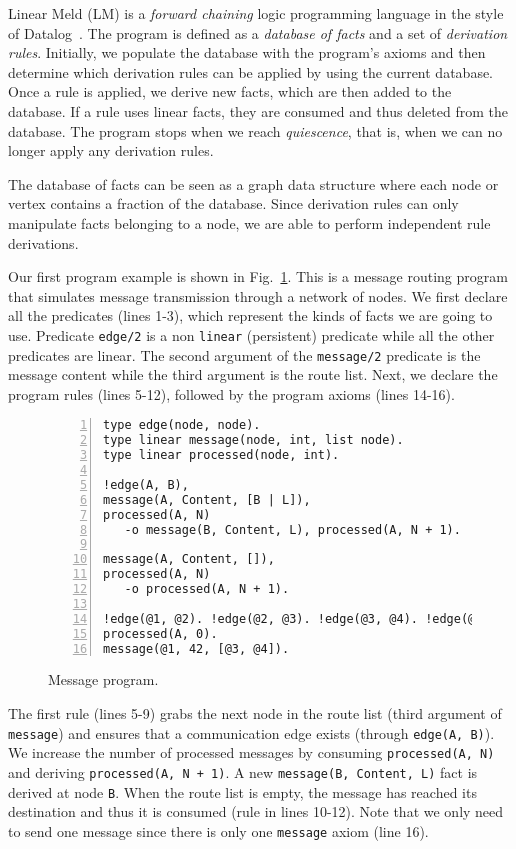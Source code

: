 
Linear Meld (LM) is a \emph{forward chaining} logic programming language in the style of Datalog~\cite{Ullman:1990:PDK:533142}. The program is defined as a \emph{database of facts} and a set of \emph{derivation rules}.
Initially, we populate the database with the program's axioms and then determine which derivation rules can be applied by using the current database. Once a rule is applied, we derive new facts, which are then added to the database.
If a rule uses linear facts, they are consumed and thus deleted from the database.
The program stops when we reach \emph{quiescence}, that is, when we can no longer
apply any derivation rules.

The database of facts can be seen as a graph data structure where each node or vertex contains a
fraction of the database.  Since derivation rules can only manipulate facts belonging to
a node, we are able to perform independent rule derivations.

Our first program example is shown in Fig.~\ref{code:message}. This is a message routing program
that simulates message transmission through a network of nodes.
We first declare all the predicates (lines 1-3), which represent the kinds of facts we are going to
use. Predicate \texttt{edge/2} is a non \texttt{linear} (persistent) predicate while all the other predicates are linear.
The second argument of the \texttt{message/2} predicate is the message content
while the third argument is the route list. Next, we declare the program rules (lines 5-12),
followed by the program axioms (lines 14-16).

\begin{figure}[h!]
\small\begin{Verbatim}[numbers=left]
type edge(node, node).
type linear message(node, int, list node).
type linear processed(node, int).

!edge(A, B),
message(A, Content, [B | L]),
processed(A, N)
   -o message(B, Content, L), processed(A, N + 1).

message(A, Content, []),
processed(A, N)
   -o processed(A, N + 1).

!edge(@1, @2). !edge(@2, @3). !edge(@3, @4). !edge(@1, @3).
processed(A, 0).
message(@1, 42, [@3, @4]).
\end{Verbatim}
\caption{Message program.}
  \label{code:message}
\end{figure}

The first rule (lines 5-9) grabs the next node in the route list (third argument of \texttt{message}) and
ensures that a communication edge exists (through \texttt{edge(A, B)}). We increase the number of
processed messages by consuming \texttt{processed(A, N)} and deriving \texttt{processed(A, N + 1)}.
A new \texttt{message(B, Content, L)} fact is derived at node \texttt{B}.
When the route list is empty, the message has reached its destination and thus it is consumed
(rule in lines 10-12).
Note that we only need to send one message since there is only one \texttt{message} axiom (line 16).

